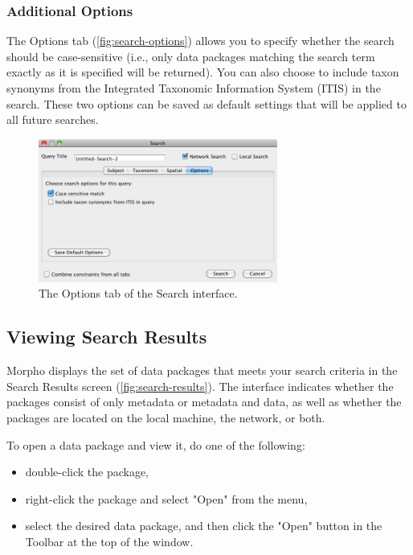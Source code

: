 \subsubsection[Options]{Additional Options} \label{sec:search-options}

The Options tab (\autoref{fig:search-options}) allows you to specify whether the search should be
case-sensitive (i.e., only data packages matching the search term
exactly as it is specified will be returned). You can also choose to
include taxon synonyms from the Integrated Taxonomic Information System
(ITIS) in the search.  These two options can be saved as default
settings that will be applied to all future searches.

\begin{figure}
  \centering
    \includegraphics[width=0.7\textwidth]{images/search-options.png}
  \caption{The Options tab of the Search interface.}
  \label{fig:search-options}
\end{figure}

\subsection{Viewing Search Results}

Morpho displays the set of data packages that meets your search criteria
in the Search Results screen (\autoref{fig:search-results}). The
interface indicates whether the packages consist of only metadata or
metadata and data, as well as whether the packages are located on the
local machine, the network, or both.

To open a data package and view it, do one of the following:
\begin{itemize}
  \setlength{\parskip}{1pt}
    \item double-click the package,
    \item right-click the package and select "Open" from the menu,
    \item select the desired data package, and then click the "Open"
      button in the Toolbar at the top of the window.
\end{itemize}

